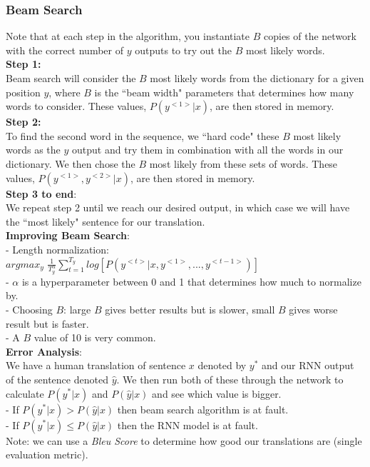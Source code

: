 \documentclass[11pt, a4paper]{article}
\begin{document}
\begin{spacing}{1.1}
	\subsubsection{Beam Search}
	Note that at each step in the algorithm, you instantiate $B$ copies of the network with the correct number of $y$ outputs to try out the $B$ most likely words.\vspace*{2mm}\\
	\textbf{Step 1:} \\
	Beam search will consider the $B$ most likely words from the dictionary for a given position $y$, where $B$ is the ``beam width" parameters that determines how many words to consider. These values, $P(y^{<1>}|x)$, are then stored in memory. \vspace*{2mm}\\
	\textbf{Step 2:} \\
	To find the second word in the sequence, we ``hard code" these $B$ most likely words as the $y$ output and try them in combination with all the words in our dictionary. We then chose the $B$ most likely from these sets of words. These values, $P(y^{<1>}, y^{<2>}|x)$, are then stored in memory. \vspace*{2mm}\\
	\textbf{Step 3 to end}:\\
	We repeat step 2 until we reach our desired output, in which case we will have the ``most likely" sentence for our translation.\vspace*{2mm}\\
	\textbf{Improving Beam Search}: \\
	- Length normalization: $ argmax_y\,\, \frac{1}{T_y^{\alpha}}\sum_{t=1}^{T_y} log[P(y^{<t>}|x, y^{<1>},..., y^{<t-1>})] $ \vspace*{.5mm}\\
	\hspace*{3mm} - $\alpha$ is a hyperparameter between 0 and 1 that determines how much to normalize by. \\
	- Choosing $B$: large $B$ gives better results but is slower, small $B$ gives worse result but is faster. \\
	\hspace*{3mm} - A $B$ value of 10 is very common. \vspace*{2mm}\\
	\textbf{Error Analysis}: \\
	We have a human translation of sentence $x$ denoted by $y^*$ and our RNN output of the sentence denoted $\hat{y}$. We then run both of these through the network to calculate $P(y^*|x)$ and $P(\hat{y}|x)$ and see which value is bigger. \\
	- If $P(y^*|x) > P(\hat{y}|x)$ then beam search algorithm is at fault. \\
	- If $P(y^*|x) \leq P(\hat{y}|x)$ then the RNN model is at fault. \vspace*{2mm}\\
	Note: we can use a \textit{Bleu Score} to determine how good our translations are (single evaluation metric). \newpage


\end{spacing}
\end{document}
